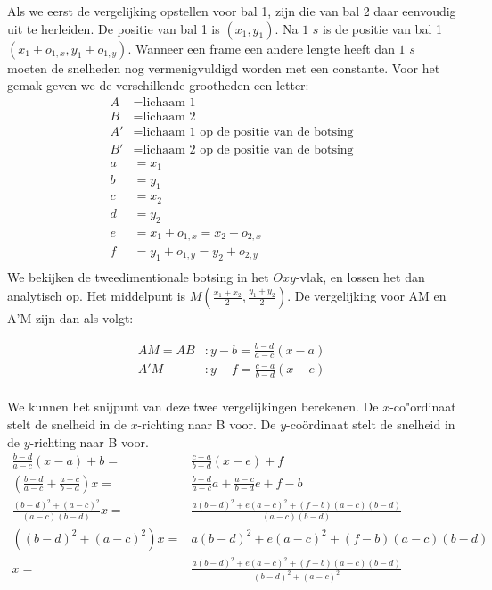 \documentclass[12pt,a4paper]{article}
\begin{document}
	Als we eerst de vergelijking opstellen voor bal 1, zijn die van bal 2 daar eenvoudig uit te herleiden. De positie van bal 1 is $(x_1,y_1)$. Na $\text{1 }s$ is de positie van bal 1 $(x_1+o_{1,x},y_1+o_{1,y})$. Wanneer een frame een andere lengte heeft dan $\text{1 }s$ moeten de snelheden nog vermenigvuldigd worden met een constante. Voor het gemak geven we de verschillende grootheden een letter:
	\begin{equation}
		\begin{aligned}
			A&=\text{lichaam 1}\\
			B&=\text{lichaam 2}\\
			A'&=\text{lichaam 1 op de positie van de botsing}\\
			B'&=\text{lichaam 2 op de positie van de botsing}\\
			a&={x_1}\\
			b&={y_1}\\
			c&={x_2}\\
			d&={y_2}\\
			e&={x_1+o_{1,x}}={x_2+o_{2,x}}\\
			f&={y_1+o_{1,y}}={y_2+o_{2,y}}\\
		\end{aligned}
	\end{equation}
	We bekijken de tweedimentionale botsing in het $Oxy$-vlak, en lossen het dan analytisch op. Het middelpunt is $M(\frac{x_1+x_2}{2}, \frac{y_1+y_2}{2})$. De vergelijking voor AM en A'M zijn dan als volgt:

	\begin{equation}
		\begin{aligned}
			AM=AB&: y-b=\frac{b-d}{a-c}\left(x-a\right)\\
			A'M&: y-f=\frac{c-a}{b-d}\left(x-e\right)\\
		\end{aligned}
	\end{equation}

	We kunnen het snijpunt van deze twee vergelijkingen berekenen. De $x$-co"{o}rdinaat stelt de snelheid in de $x$-richting naar B voor. De $y$-co\"{o}rdinaat stelt de snelheid in de $y$-richting naar B voor.
	\begin{equation}
		\begin{aligned}
			\frac{b-d}{a-c}\left(x-a\right)+b=&\frac{c-a}{b-d}\left(x-e\right)+f\\
			\left(\frac{b-d}{a-c}+\frac{a-c}{b-d}\right)x=&\frac{b-d}{a-c}a+\frac{a-c}{b-d}e+f-b\\
			\frac{(b-d)^2+(a-c)^2}{(a-c)(b-d)}x=&\frac{a(b-d)^2+e(a-c)^2+(f-b)(a-c)(b-d)}{(a-c)(b-d)}\\
			\left((b-d)^2+(a-c)^2\right)x=&a(b-d)^2+e(a-c)^2+(f-b)(a-c)(b-d)\\
			x=&\frac{a(b-d)^2+e(a-c)^2+(f-b)(a-c)(b-d)}{(b-d)^2+(a-c)^2}\\
		\end{aligned}
	\end{equation}
\end{document}
